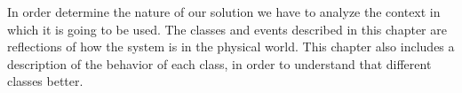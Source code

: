 In order determine the nature of our solution we have to analyze the context in which it is going to be used.
The classes and events described in this chapter are reflections of how the system is in the physical world.
This chapter also includes a description of the behavior of each class, in order to understand that different classes better.






